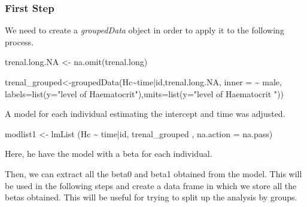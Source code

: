 \documentclass[
]{article}
\newenvironment{Shaded}{\begin{snugshade}}{\end{snugshade}}
\newcommand{\AttributeTok}[1]{\textcolor[rgb]{0.77,0.63,0.00}{#1}}
\newcommand{\FunctionTok}[1]{\textcolor[rgb]{0.00,0.00,0.00}{#1}}
\newcommand{\NormalTok}[1]{#1}
\newcommand{\OtherTok}[1]{\textcolor[rgb]{0.56,0.35,0.01}{#1}}
\newcommand{\SpecialCharTok}[1]{\textcolor[rgb]{0.00,0.00,0.00}{#1}}
\newcommand{\StringTok}[1]{\textcolor[rgb]{0.31,0.60,0.02}{#1}}
\begin{document}
\hypertarget{first-step}{%
\subsubsection{First Step}\label{first-step}}

We need to create a \emph{groupedData} object in order to apply it to
the following process.

\begin{Shaded}
\begin{Highlighting}[]
\NormalTok{trenal.long.NA }\OtherTok{\textless{}{-}} \FunctionTok{na.omit}\NormalTok{(trenal.long)}

\NormalTok{trenal\_grouped}\OtherTok{\textless{}{-}}\FunctionTok{groupedData}\NormalTok{(Hc}\SpecialCharTok{\textasciitilde{}}\NormalTok{time}\SpecialCharTok{|}\NormalTok{id,trenal.long.NA, }\AttributeTok{inner =} \SpecialCharTok{\textasciitilde{}}\NormalTok{ male, }\AttributeTok{labels=}\FunctionTok{list}\NormalTok{(}\AttributeTok{y=}\StringTok{"level of Haematocrit"}\NormalTok{),}\AttributeTok{units=}\FunctionTok{list}\NormalTok{(}\AttributeTok{y=}\StringTok{"level of Haematocrit "}\NormalTok{))}
\end{Highlighting}
\end{Shaded}

A model for each individual estimating the intercept and time was
adjusted.

\begin{Shaded}
\begin{Highlighting}[]
\NormalTok{modlist1 }\OtherTok{\textless{}{-}} \FunctionTok{lmList}\NormalTok{ (Hc }\SpecialCharTok{\textasciitilde{}}\NormalTok{ time}\SpecialCharTok{|}\NormalTok{id, trenal\_grouped , }\AttributeTok{na.action =}\NormalTok{ na.pass)}
\end{Highlighting}
\end{Shaded}

Here, he have the model with a beta for each individual.

Then, we can extract all the beta0 and beta1 obtained from the model.
This will be used in the following steps and create a data frame in
which we store all the betas obtained. This will be useful for trying to
split up the analysis by groups.
\end{document}
